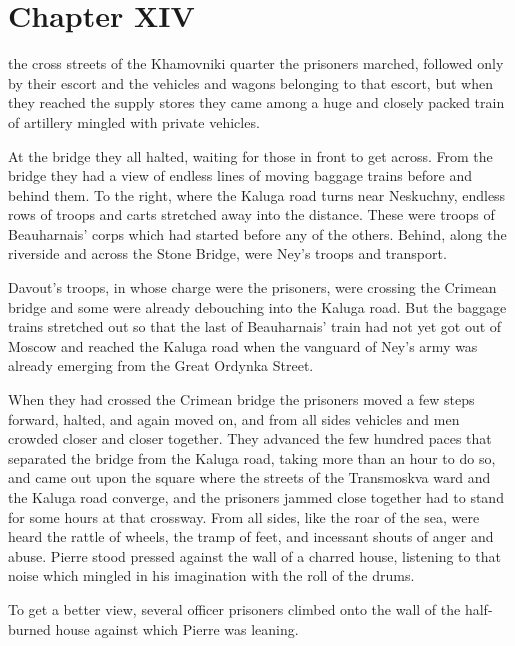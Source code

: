 \chapter*{Chapter XIV} \ifaudio {}
\fi

 the cross streets of the Khamovniki quarter the prisoners
marched, followed only by their escort and the vehicles and
wagons belonging to that escort, but when they reached the supply
stores they came among a huge and closely packed train of
artillery mingled with private vehicles.

At the bridge they all halted, waiting for those in front to get
across.  From the bridge they had a view of endless lines of
moving baggage trains before and behind them. To the right, where
the Kaluga road turns near Neskuchny, endless rows of troops and
carts stretched away into the distance. These were troops of
Beauharnais' corps which had started before any of the
others. Behind, along the riverside and across the Stone Bridge,
were Ney's troops and transport.

Davout's troops, in whose charge were the prisoners, were
crossing the Crimean bridge and some were already debouching into
the Kaluga road.  But the baggage trains stretched out so that
the last of Beauharnais' train had not yet got out of Moscow and
reached the Kaluga road when the vanguard of Ney's army was
already emerging from the Great Ordynka Street.

When they had crossed the Crimean bridge the prisoners moved a
few steps forward, halted, and again moved on, and from all sides
vehicles and men crowded closer and closer together. They
advanced the few hundred paces that separated the bridge from the
Kaluga road, taking more than an hour to do so, and came out upon
the square where the streets of the Transmoskva ward and the
Kaluga road converge, and the prisoners jammed close together had
to stand for some hours at that crossway. From all sides, like
the roar of the sea, were heard the rattle of wheels, the tramp
of feet, and incessant shouts of anger and abuse. Pierre stood
pressed against the wall of a charred house, listening to that
noise which mingled in his imagination with the roll of the
drums.

To get a better view, several officer prisoners climbed onto the
wall of the half-burned house against which Pierre was leaning.


